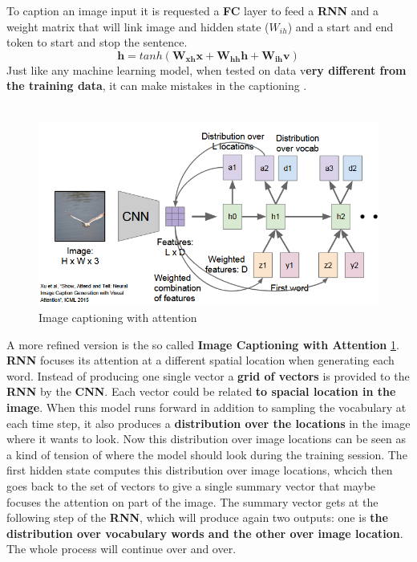 \documentclass[11pt]{article}
\begin{document}
\clearpage
To caption an image input  it is requested a \textbf{FC} layer to feed a \textbf{RNN} and a weight matrix that will link image and hidden state ($W_{ih}$) and a start and end token to start and stop the sentence. 
\begin{equation}
   \mathbf{ h} = tanh(\mathbf{W_{xh} x + W_{hh}h+ W_{ih}v})
\end{equation}{}
Just like any machine learning model, when tested on data v\textbf{ery different from the training data}, it can make mistakes in the captioning .\\\\
\begin{figure}[h]
\centering
\captionsetup{justification=centering}
\includegraphics[width=0.8\linewidth]{L919.pdf}
\caption{ Image captioning with attention}
\label{fig:L919}
\end{figure}

A more refined version is the so called \textbf{Image Captioning with Attention} \ref{fig:L919}. \textbf{RNN } focuses its attention at a different spatial location when generating each word. Instead of producing one single vector a \textbf{grid of vectors} is provided to the \textbf{RNN} by the \textbf{CNN}. Each vector could be related \textbf{to spacial location in the image}. When this model runs forward in addition to sampling the vocabulary at each time step, it also produces a \textbf{distribution over the locations} in the image where it wants to look. Now this distribution over image locations can be seen as a kind of tension of where the model should look during the training session. The first hidden state computes this distribution over image locations, whcich then goes back  to the set of vectors to give a single summary vector that maybe focuses the attention on part of the image. The summary vector gets at the following step of the \textbf{RNN}, which will produce again two outputs: one is \textbf{the distribution over vocabulary words and the other over image location}. The whole process will continue over and over.
\clearpage
\end{document}
